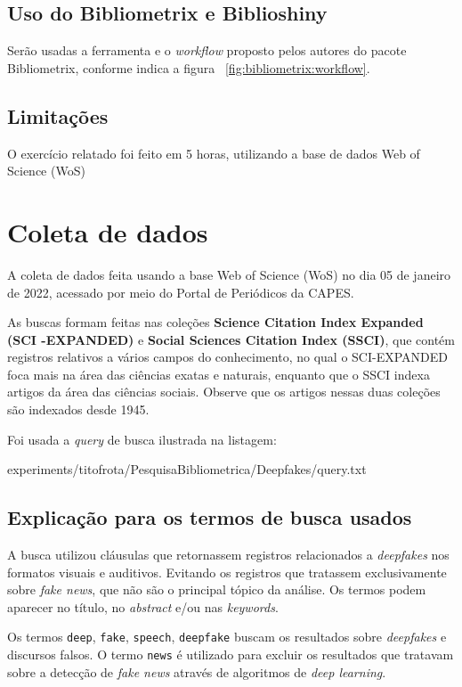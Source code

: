 \subsection{Uso do Bibliometrix e Biblioshiny}
Serão usadas a ferramenta e o \textit{workflow} proposto pelos autores do pacote Bibliometrix, conforme indica a figura ~\ref{fig:bibliometrix:workflow}.

\subsection{Limitações} O exercício relatado foi feito em 5 horas, utilizando a base de dados Web of Science (WoS)


\section{Coleta de dados\label{MASSA:coleta}}

A coleta de dados feita usando a base Web of Science (WoS) no dia 05 de janeiro de 2022, acessado por meio do Portal de Periódicos da CAPES.

As buscas formam feitas nas coleções \textbf{Science  Citation  Index  Expanded (SCI -EXPANDED)} e \textbf{Social  Sciences  Citation  Index (SSCI)}, que contém registros relativos a vários campos do conhecimento, no qual o SCI-EXPANDED foca mais na área das ciências exatas e naturais, enquanto que o SSCI indexa artigos da área das ciências sociais. Observe que os artigos nessas duas coleções são indexados desde 1945. 

Foi usada a \textit{query} de busca ilustrada na listagem:


{experiments/titofrota/PesquisaBibliometrica/Deepfakes/query.txt}

\subsection{Explicação para os termos de busca usados\label{sec:titofrota:query}}

A busca utilizou cláusulas que retornassem registros relacionados a \textit{deepfakes} nos formatos visuais e auditivos. Evitando os registros que tratassem exclusivamente sobre \textit{fake news}, que não são o principal tópico da análise. Os termos podem aparecer no título, no \textit{abstract} e/ou nas \textit{keywords}. 

Os termos \texttt{deep}, \texttt{fake}, \texttt{speech}, \texttt{deepfake} buscam os resultados sobre \textit{deepfakes} e discursos falsos. O termo \texttt{news} é utilizado para excluir os resultados que tratavam sobre a detecção de \textit{fake news} através de algoritmos de \textit{deep learning}.

